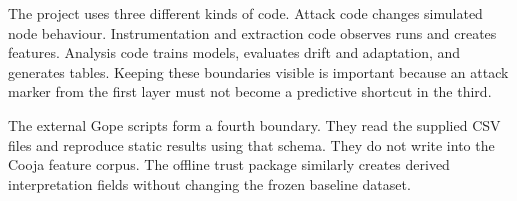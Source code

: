 The project uses three different kinds of code. Attack code changes simulated node behaviour. Instrumentation and extraction code observes runs and creates features. Analysis code trains models, evaluates drift and adaptation, and generates tables. Keeping these boundaries visible is important because an attack marker from the first layer must not become a predictive shortcut in the third.

The external Gope scripts form a fourth boundary. They read the supplied CSV files and reproduce static results using that schema. They do not write into the Cooja feature corpus. The offline trust package similarly creates derived interpretation fields without changing the frozen baseline dataset.
